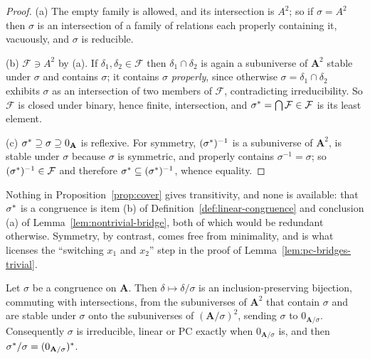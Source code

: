 \begin{proof}
(a) The empty family is allowed, and its intersection is $A^{2}$; so if
$\sigma=A^{2}$ then $\sigma$ is an intersection of a family of relations each
properly containing it, vacuously, and $\sigma$ is reducible.

(b) $\mathcal F\ni A^{2}$ by (a). If $\delta_{1},\delta_{2}\in\mathcal F$ then
$\delta_{1}\cap\delta_{2}$ is again a subuniverse of $\mathbf A^{2}$ stable
under $\sigma$ and contains $\sigma$; it contains $\sigma$ \emph{properly},
since otherwise $\sigma=\delta_{1}\cap\delta_{2}$ exhibits $\sigma$ as an
intersection of two members of $\mathcal F$, contradicting irreducibility. So
$\mathcal F$ is closed under binary, hence finite, intersection, and
$\sigma^{*}=\bigcap\mathcal F\in\mathcal F$ is its least element.

(c) $\sigma^{*}\supseteq\sigma\supseteq 0_{\mathbf A}$ is reflexive. For
symmetry, $(\sigma^{*})^{-1}$ is a subuniverse of $\mathbf A^{2}$, is
stable under $\sigma$ because $\sigma$ is symmetric, and properly contains
$\sigma^{-1}=\sigma$; so $(\sigma^{*})^{-1}\in\mathcal F$ and therefore
$\sigma^{*}\subseteq(\sigma^{*})^{-1}$, whence equality.
\end{proof}

\begin{remark}\label{rem:cover-not-cong}
Nothing in Proposition~\ref{prop:cover} gives transitivity, and none is
available: that $\sigma^{*}$ is a congruence is item (b) of
Definition~\ref{def:linear-congruence} and conclusion (a) of
Lemma~\ref{lem:nontrivial-bridge}, both of which would be redundant otherwise.
Symmetry, by contrast, comes free from minimality, and is what licenses the
``switching $x_{1}$ and $x_{2}$'' step in the proof of
Lemma~\ref{lem:pc-bridges-trivial}.
\end{remark}

\begin{lemma}\label{lem:irred-quotient}
Let $\sigma$ be a congruence on $\mathbf A$. Then $\delta\mapsto\delta/\sigma$
is an inclusion-preserving bijection, commuting with intersections, from the
subuniverses of $\mathbf A^{2}$ that contain $\sigma$ and are stable under
$\sigma$ onto the subuniverses of $(\mathbf A/\sigma)^{2}$, sending $\sigma$ to
$0_{\mathbf A/\sigma}$. Consequently $\sigma$ is irreducible, linear or PC
exactly when $0_{\mathbf A/\sigma}$ is, and then
$\sigma^{*}/\sigma=(0_{\mathbf A/\sigma})^{*}$.
\end{lemma}

